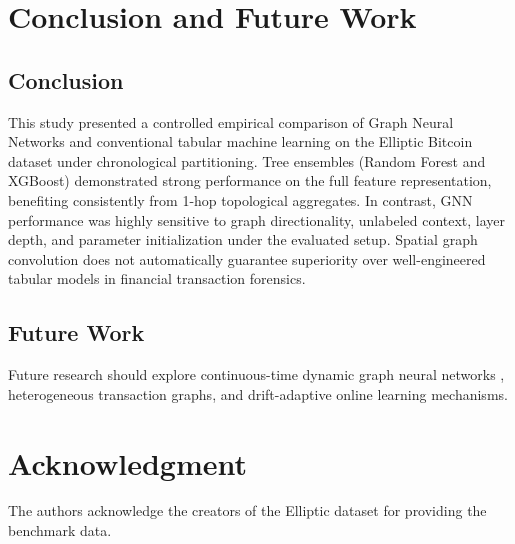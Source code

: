 \documentclass[conference]{IEEEtran}
\begin{document}
\section{Conclusion and Future Work}

\subsection{Conclusion}
This study presented a controlled empirical comparison of Graph Neural Networks and conventional tabular machine learning on the Elliptic Bitcoin dataset under chronological partitioning. Tree ensembles (Random Forest and XGBoost) demonstrated strong performance on the full feature representation, benefiting consistently from 1-hop topological aggregates. In contrast, GNN performance was highly sensitive to graph directionality, unlabeled context, layer depth, and parameter initialization under the evaluated setup. Spatial graph convolution does not automatically guarantee superiority over well-engineered tabular models in financial transaction forensics.

\subsection{Future Work}
Future research should explore continuous-time dynamic graph neural networks \cite{rossi2020temporal, xu2020inductive}, heterogeneous transaction graphs, and drift-adaptive online learning mechanisms.

\section*{Acknowledgment}
The authors acknowledge the creators of the Elliptic dataset for providing the benchmark data.



\end{document}
